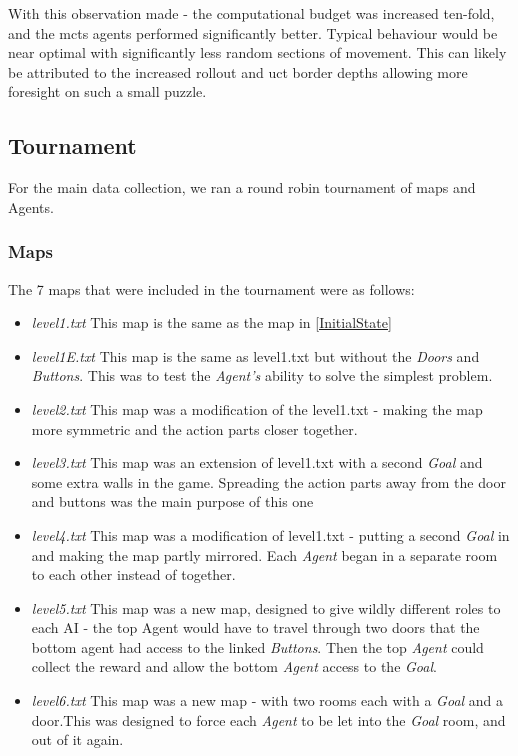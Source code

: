 \documentclass{IEEEtran}
\begin{document}
With this observation made - the computational budget was increased ten-fold, and the \gls{mcts} agents performed significantly better. Typical behaviour would be near optimal with significantly less random sections of movement. This can likely be attributed to the increased rollout and uct border depths allowing more foresight on such a small puzzle.
\subsection{Tournament}
For the main data collection, we ran a round robin tournament of maps and Agents.

\subsubsection{Maps}
The 7 maps that were included in the tournament were as follows:
\begin{itemize}
\item{\emph{level1.txt} This map is the same as the map in \ref{InitialState}}
\item{\emph{level1E.txt} This map is the same as level1.txt but without the \emph{Doors} and \emph{Buttons}. This was to test the \emph{Agent's} ability to solve the simplest problem.}
\item{\emph{level2.txt} This map was a modification of the level1.txt - making the map more symmetric and the action parts closer together.}
\item{\emph{level3.txt} This map was an extension of level1.txt with a second \emph{Goal} and some extra walls in the game. Spreading the action parts away from the door and buttons was the main purpose of this one}
\item{\emph{level4.txt} This map was a modification of level1.txt - putting a second \emph{Goal} in and making the map partly mirrored. Each \emph{Agent} began in a separate room to each other instead of together.}
\item{\emph{level5.txt} This map was a new map, designed to give wildly different roles to each AI - the top Agent would have to travel through two doors that the bottom agent had access to the linked \emph{Buttons}. Then the top \emph{Agent} could collect the reward and allow the bottom \emph{Agent} access to the \emph{Goal}.}
\item{\emph{level6.txt} This map was a new map - with two rooms each with a \emph{Goal} and a door.This was designed to force each \emph{Agent} to be let into the \emph{Goal} room, and out of it again.}
\end{itemize}
\end{document}
